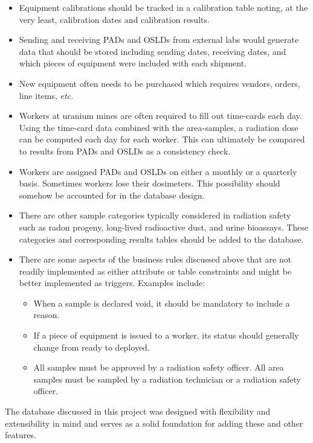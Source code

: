 \documentclass[12pt,a4paper]{article}
\begin{document}
\begin{itemize}
    \item Equipment calibrations should be tracked in a calibration table noting, at the very least, calibration dates and calibration results.
    \item Sending and receiving PADs and OSLDs from external labs would generate data that should be stored including sending dates, receiving dates, and which pieces of equipment were included with each shipment.
    \item New equipment often needs to be purchased which requires vendors, orders, line items, \textit{etc.}
    \item Workers at uranium mines are often required to fill out time-cards each day. Using the time-card data combined with the area-samples, a radiation dose can be computed each day for each worker. This can ultimately be compared to results from PADs and OSLDs as a consistency check.
    \item Workers are assigned PADs and OSLDs on either a monthly or a quarterly basis. Sometimes workers lose their dosimeters. This possibility should somehow be accounted for in the database design.
    \item There are other sample categories typically considered in radiation safety such as radon progeny, long-lived radioactive dust, and urine bioassays. These categories and corresponding results tables should be added to the database.
    \item There are some aspects of the business rules discussed above that are not readily implemented as either attribute or table constraints and might be better implemented as triggers. Examples include:
    \begin{itemize}
        \item When a sample is declared void, it should be mandatory to include a reason.
        \item If a piece of equipment is issued to a worker, its status should generally change from ready to deployed.
        \item All samples must be approved by a radiation safety officer. All area samples must be sampled by a radiation technician or a radiation safety officer.
    \end{itemize}
\end{itemize}

The database discussed in this project was designed with flexibility and extensibility in mind and serves as a solid foundation for adding these and other features.
\end{document}
